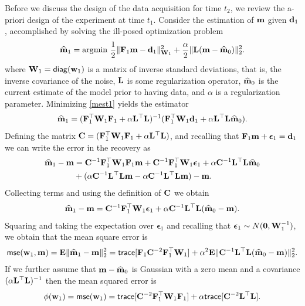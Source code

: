 \documentclass[leqno,onefignum,onetabnum]{siamltexmm}
\newcommand{\bfC}	{{\bf{C}}}
\newcommand{\bfE}	{{\bf{E}}}
\newcommand{\bfF}	{{\bf{F}}}
\newcommand{\bfL}	{{\bf{L}}}
\newcommand{\bfW}	{{\bf{W}}}
\newcommand{\bfd}	{{\bf{d}}}
\newcommand{\bfm}	{{\bf{m}}}
\newcommand{\bfw}	{{\bf{w}}}
\newcommand{\hf}        {{\frac 12}}
\newcommand{\bfepsilon} {{\boldsymbol \epsilon}}
\newcommand {\zero}  {{\bf 0}}
\renewcommand{\hf}		 {\frac12}
\newcommand{\bfmhat}    {{\widehat{\bfm}}}
\newcommand{\LtL}       { \bfL^{\top}\bfL}
\begin{document}
Before we discuss the design of the data acquisition for time $t_{2}$,
 we review the a-priori design of the experiment at time $t_{1}$.  
Consider  the estimation of $\bfm$ given $\bfd_{1}$,  accomplished by solving the ill-posed optimization problem
\begin{align}
\label{mest1}
\widehat \bfm_{1} = {\rm arg}{\min} \ \hf \| \bfF_{1} \bfm - \bfd_{1}\|^{2}_{\bfW_{1}} + {\frac {\alpha} 2}
\|\bfL (\bfm - \bfmhat_{0}) \|^{2}_2. 
\end{align}
where $\bfW_{1} = {\sf diag}(\bfw_{1})$ is a matrix of inverse standard deviations, 
that is, the inverse covariance of the noise, $\bfL$ is some regularization operator, $\bfmhat_{0}$ is
the current estimate of the model prior to having data, and $\alpha$ is a regularization parameter.
Minimizing \eqref{mest1} yields the estimator
\begin{align}
\label{mest}
\widehat \bfm_{1} = (\bfF_{1}^{\top} \bfW_{1}\bfF_{1} + \alpha \LtL)^{-1} (\bfF_{1}^{\top} \bfW_{1} \bfd_{1}
+ \alpha \LtL \bfmhat_{0}).
\end{align}
Defining the matrix $\bfC = (\bfF_{1}^{\top} \bfW_{1}\bfF_{1} + \alpha \LtL)$, and recalling that $\bfF_1\bfm + \bfepsilon_1 = \bfd_1$ we can write
the error in the recovery as
\begin{align}
\bfmhat_1 -\bfm &= \bfC^{-1} \bfF_{1}^{\top} \bfW_{1}\bfF_{1} \bfm + \bfC^{-1} \bfF_{1}^{\top} \bfW_{1}\bfepsilon_1 + \alpha
\bfC^{-1} \LtL \bfmhat_{0} \\
\nonumber
&+ (\alpha \bfC^{-1} \LtL\bfm
- \alpha \bfC^{-1} \LtL \bfm) 
 -\bfm.
\end{align}
Collecting terms and using the definition of $\bfC$ we obtain
\begin{align*}
\label{diffmod}
\bfmhat_1 -\bfm = \bfC^{-1} \bfF_{1}^{\top} \bfW_{1} \bfepsilon_1 + \alpha \bfC^{-1} \LtL (\bfmhat_{0} - \bfm).
\end{align*}
Squaring and taking the expectation over $\bfepsilon_1$ and recalling that $ \bfepsilon_1 \sim N(\zero,\bfW_{1}^{-1})$, we obtain that the mean square error is
\begin{align}
{\sf mse}(\bfw_1,\bfm) = \bfE\| \bfmhat_1 -\bfm \|^{2}_2 = {\sf trace}[   \bfF_{1} \bfC^{-2} \bfF_{1}^{\top} \bfW_{1}]  + 
\alpha^2 \bfE\| \bfC^{-1} \LtL (\bfmhat_{0} - \bfm) \|^{2}_2.
\end{align}
If we further assume that $\bfm-\bfmhat_{0}$ is Gaussian with a zero mean and a covariance
$(\alpha \LtL)^{-1}$ then the mean squared error is 
\begin{align}
\phi(\bfw_1 ) = {\sf mse}(\bfw_1) = {\sf trace}[    \bfC^{-2} \bfF_{1}^{\top}\bfW_{1}\bfF_{1}]  + 
 \alpha {\sf trace} [\bfC^{-2} \LtL]. 
\end{align}
\end{document}
